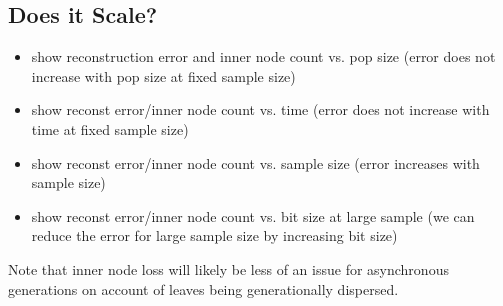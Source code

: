 

\subsection{Does it Scale?} \label{sec:scaling}



\begin{itemize}
    \item show reconstruction error and inner node count vs. pop size (error does not increase with pop size at fixed sample size)
    \item show reconst error/inner node count vs. time (error does not increase with time at fixed sample size)
    \item show reconst error/inner node count vs. sample size (error increases with sample size)
    \item show reconst error/inner node count vs. bit size at large sample (we can reduce the error for large sample size by increasing bit size)
\end{itemize}

Note that inner node loss will likely be less of an issue for asynchronous generations on account of leaves being generationally dispersed.
